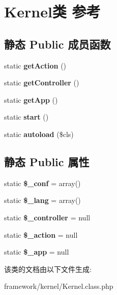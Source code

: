 \hypertarget{classKernel}{\section{Kernel类 参考}
\label{classKernel}
}
\subsection*{静态 Public 成员函数}
\begin{DoxyCompactItemize}
\item 
\hypertarget{classKernel_adae22895c0f3adaee745cf1faafd91bd}{static {\bfseries get\+Action} ()}\label{classKernel_adae22895c0f3adaee745cf1faafd91bd}

\item 
\hypertarget{classKernel_a7eb309e34b34e32906b1fc925c4e554a}{static {\bfseries get\+Controller} ()}\label{classKernel_a7eb309e34b34e32906b1fc925c4e554a}

\item 
\hypertarget{classKernel_ae679cf53fc7679a9ef63e3946d1dc9f0}{static {\bfseries get\+App} ()}\label{classKernel_ae679cf53fc7679a9ef63e3946d1dc9f0}

\item 
\hypertarget{classKernel_acd73f70590e6ee67a411a992a98d35ad}{static {\bfseries start} ()}\label{classKernel_acd73f70590e6ee67a411a992a98d35ad}

\item 
\hypertarget{classKernel_aeee611f4e7031080669eac4861aed49e}{static {\bfseries autoload} (\$cls)}\label{classKernel_aeee611f4e7031080669eac4861aed49e}

\end{DoxyCompactItemize}
\subsection*{静态 Public 属性}
\begin{DoxyCompactItemize}
\item 
\hypertarget{classKernel_a6de70829e0267fd8423031ee09e10175}{static {\bfseries \$\+\_\+conf} = array()}\label{classKernel_a6de70829e0267fd8423031ee09e10175}

\item 
\hypertarget{classKernel_a645c81cbadb3480e9786a6134291a82a}{static {\bfseries \$\+\_\+lang} = array()}\label{classKernel_a645c81cbadb3480e9786a6134291a82a}

\item 
\hypertarget{classKernel_a483fbb05c80bfa1925d66534342de96c}{static {\bfseries \$\+\_\+controller} = null}\label{classKernel_a483fbb05c80bfa1925d66534342de96c}

\item 
\hypertarget{classKernel_a68d46745cabb79d22cff078bb8d7f698}{static {\bfseries \$\+\_\+action} = null}\label{classKernel_a68d46745cabb79d22cff078bb8d7f698}

\item 
\hypertarget{classKernel_ad495ae990f2a8ff8645f03792ac63e40}{static {\bfseries \$\+\_\+app} = null}\label{classKernel_ad495ae990f2a8ff8645f03792ac63e40}

\end{DoxyCompactItemize}


该类的文档由以下文件生成\+:\begin{DoxyCompactItemize}
\item 
framework/kernel/Kernel.\+class.\+php\end{DoxyCompactItemize}
